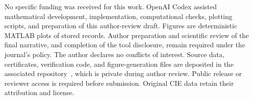 \documentclass{optica-article}
\begin{document}
\begin{backmatter}
 No specific funding was received for this work.
 OpenAI Codex assisted mathematical development, implementation, computational checks, plotting scripts, and preparation of this author-review draft. Figures are deterministic MATLAB plots of stored records. Author preparation and scientific review of the final narrative, and completion of the tool disclosure, remain required under the journal's policy.
 The author declares no conflicts of interest.
 Source data, certificates, verification code, and figure-generation files are deposited in the associated repository~\cite{repository}, which is private during author review. Public release or reviewer access is required before submission. Original CIE data retain their attribution and license.
\end{backmatter}
\end{document}
